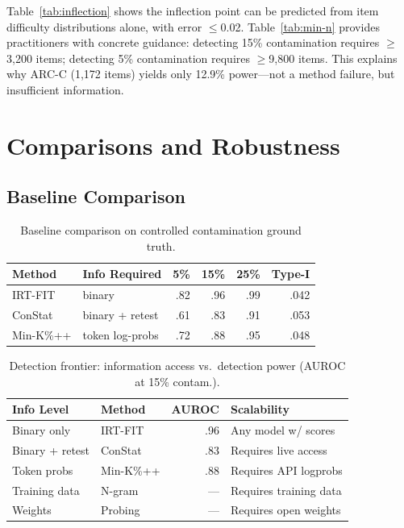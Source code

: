 \documentclass[11pt,a4paper]{article}
\begin{document}
Table~\ref{tab:inflection} shows the inflection point can be predicted from item difficulty distributions alone, with error $\leq$0.02. Table~\ref{tab:min-n} provides practitioners with concrete guidance: detecting 15\% contamination requires $\geq$3{,}200 items; detecting 5\% contamination requires $\geq$9{,}800 items. This explains why ARC-C (1{,}172 items) yields only 12.9\% power---not a method failure, but insufficient information.

\section{Comparisons and Robustness}
\label{sec:comparison}

\subsection{Baseline Comparison}
\label{sec:baselines}

\begin{table}[t]
\centering
\caption{Baseline comparison on controlled contamination ground truth.}
\label{tab:baseline}
\small
\begin{tabular}{llrrrr}
\toprule
\textbf{Method} & \textbf{Info Required} & \textbf{5\%} & \textbf{15\%} & \textbf{25\%} & \textbf{Type-I} \\
\midrule
IRT-FIT & binary & .82 & .96 & .99 & .042 \\
ConStat & binary + retest & .61 & .83 & .91 & .053 \\
Min-K\%++ & token log-probs & .72 & .88 & .95 & .048 \\
\bottomrule
\end{tabular}
\end{table}

\begin{table}[t]
\centering
\caption{Detection frontier: information access vs.\ detection power (AUROC at 15\% contam.).}
\label{tab:frontier}
\small
\begin{tabular}{llrl}
\toprule
\textbf{Info Level} & \textbf{Method} & \textbf{AUROC} & \textbf{Scalability} \\
\midrule
Binary only & IRT-FIT & .96 & Any model w/ scores \\
Binary + retest & ConStat & .83 & Requires live access \\
Token probs & Min-K\%++ & .88 & Requires API logprobs \\
Training data & N-gram & --- & Requires training data \\
Weights & Probing & --- & Requires open weights \\
\bottomrule
\end{tabular}
\end{table}
\end{document}
